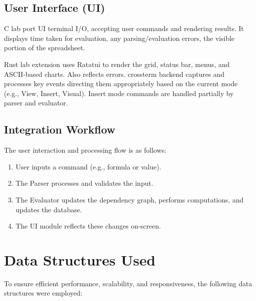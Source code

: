 \documentclass[12pt]{article}
\begin{document}
\subsection{User Interface (UI)}
C lab port UI terminal I/O, accepting user commands and rendering results. It displays time taken for evaluation, any parsing/evaluation errors, the visible portion of the spreadsheet.

Rust lab extension uses Ratatui to render the grid, status bar, menus, and ASCII-based charts. Also reflects errors. crossterm backend captures and processes key events directing them appropriately based on the current mode (e.g., View, Insert, Visual). Insert mode commands are handled partially by parser and evaluator.

\subsection{Integration Workflow}
The user interaction and processing flow is as follows:
\begin{enumerate}
  \item User inputs a command (e.g., formula or value).
  \item The Parser processes and validates the input.
  \item The Evaluator updates the dependency graph, performs computations, and updates the database.
  \item The UI module reflects these changes on-screen.
\end{enumerate}


\section{Data Structures Used}
To ensure efficient performance, scalability, and responsiveness, the following data structures were employed:
\end{document}
